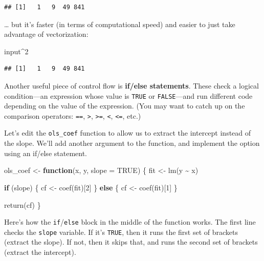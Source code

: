\documentclass[
  12pt,
  oneside,openany]{book}
\newenvironment{Shaded}{\begin{snugshade}}{\end{snugshade}}
\newcommand{\AttributeTok}[1]{\textcolor[rgb]{0.77,0.63,0.00}{#1}}
\newcommand{\ConstantTok}[1]{\textcolor[rgb]{0.00,0.00,0.00}{#1}}
\newcommand{\ControlFlowTok}[1]{\textcolor[rgb]{0.13,0.29,0.53}{\textbf{#1}}}
\newcommand{\DecValTok}[1]{\textcolor[rgb]{0.00,0.00,0.81}{#1}}
\newcommand{\FunctionTok}[1]{\textcolor[rgb]{0.00,0.00,0.00}{#1}}
\newcommand{\NormalTok}[1]{#1}
\newcommand{\OtherTok}[1]{\textcolor[rgb]{0.56,0.35,0.01}{#1}}
\newcommand{\SpecialCharTok}[1]{\textcolor[rgb]{0.00,0.00,0.00}{#1}}
\begin{document}
\begin{verbatim}
## [1]   1   9  49 841
\end{verbatim}

\ldots{} but it's faster (in terms of computational speed) and easier to just take advantage of vectorization:

\begin{Shaded}
\begin{Highlighting}[]
\NormalTok{input}\SpecialCharTok{\^{}}\DecValTok{2}
\end{Highlighting}
\end{Shaded}

\begin{verbatim}
## [1]   1   9  49 841
\end{verbatim}

Another useful piece of control flow is \textbf{if/else statements}. These check a logical condition---an expression whose value is \texttt{TRUE} or \texttt{FALSE}---and run different code depending on the value of the expression. (You may want to catch up on the comparison operators: \texttt{==}, \texttt{\textgreater{}}, \texttt{\textgreater{}=}, \texttt{\textless{}}, \texttt{\textless{}=}, etc.)

Let's edit the \texttt{ols\_coef} function to allow us to extract the intercept instead of the slope. We'll add another argument to the function, and implement the option using an if/else statement.

\begin{Shaded}
\begin{Highlighting}[]
\NormalTok{ols\_coef }\OtherTok{\textless{}{-}} \ControlFlowTok{function}\NormalTok{(x, y, }\AttributeTok{slope =} \ConstantTok{TRUE}\NormalTok{) \{}
\NormalTok{  fit }\OtherTok{\textless{}{-}} \FunctionTok{lm}\NormalTok{(y }\SpecialCharTok{\textasciitilde{}}\NormalTok{ x)}

  \ControlFlowTok{if}\NormalTok{ (slope) \{}
\NormalTok{    cf }\OtherTok{\textless{}{-}} \FunctionTok{coef}\NormalTok{(fit)[}\DecValTok{2}\NormalTok{]}
\NormalTok{  \} }\ControlFlowTok{else}\NormalTok{ \{}
\NormalTok{    cf }\OtherTok{\textless{}{-}} \FunctionTok{coef}\NormalTok{(fit)[}\DecValTok{1}\NormalTok{]}
\NormalTok{  \}}

  \FunctionTok{return}\NormalTok{(cf)}
\NormalTok{\}}
\end{Highlighting}
\end{Shaded}

Here's how the \texttt{if}/\texttt{else} block in the middle of the function works.
The first line checks the \texttt{slope} variable.
If it's \texttt{TRUE}, then it runs the first set of brackets (extract the slope).
If not, then it skips that, and runs the second set of brackets (extract the intercept).
\end{document}
